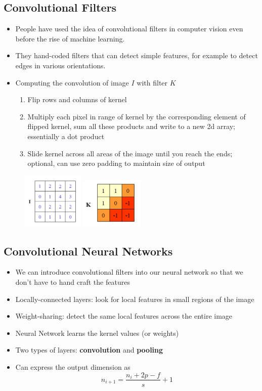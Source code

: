 \documentclass[11pt]{article}
\begin{document}
\subsection{Convolutional Filters}
\begin{itemize}
\item People have used the idea of convolutional filters in computer vision even before the rise of machine learning.
\item They hand-coded filters that can detect simple features, for example to detect edges in various orientations.
\item Computing the convolution of image $I$ with filter $K$
\begin{enumerate}
\item Flip rows and columns of kernel
\item Multiply each pixel in range of kernel by the corresponding element of flipped kernel, sum all these products and write to a new 2d array; essentially a dot product 
\item Slide kernel across all areas of the image until you reach the ends; optional,  can use zero padding to maintain size of output
\end{enumerate}
\end{itemize}
\begin{figure}[H]
\begin{center}
\subfigure
{\includegraphics[width=3cm]{images/I.png}}
\subfigure
{\includegraphics[width=3cm]{images/K.png}}
\end{center}
\end{figure}

\subsection{Convolutional Neural Networks}
\begin{itemize}
\item We can introduce convolutional filters into our neural network so that we don’t have to hand craft the features
\item Locally-connected layers: look for local features in small regions of the image
\item Weight-sharing: detect the same local features across the entire image
\item Neural Network learns the kernel values (or weights)
\item Two types of layers: \textbf{convolution} and \textbf{pooling}
\item Can express the output dimension as 
$$ n_{i+1} = \frac{n_i + 2p-f}{s} + 1 $$
\end{itemize}
\end{document}
